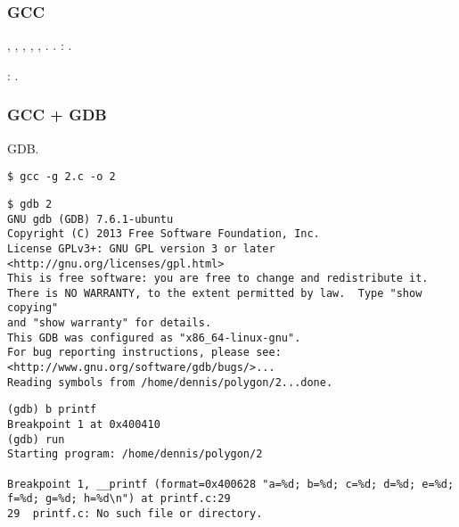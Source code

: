 \ifdefined\IncludeGCC
\subsubsection{GCC}

 \RDI, \RSI,
\RDX, \RCX, , .
.
: .

%
: .



\ifdefined\IncludeGDB
\subsubsection{GCC + GDB}

 \ac{GDB}.

\begin{lstlisting}
$ gcc -g 2.c -o 2
\end{lstlisting}

\begin{lstlisting}
$ gdb 2
GNU gdb (GDB) 7.6.1-ubuntu
Copyright (C) 2013 Free Software Foundation, Inc.
License GPLv3+: GNU GPL version 3 or later <http://gnu.org/licenses/gpl.html>
This is free software: you are free to change and redistribute it.
There is NO WARRANTY, to the extent permitted by law.  Type "show copying"
and "show warranty" for details.
This GDB was configured as "x86_64-linux-gnu".
For bug reporting instructions, please see:
<http://www.gnu.org/software/gdb/bugs/>...
Reading symbols from /home/dennis/polygon/2...done.
\end{lstlisting}

\begin{lstlisting}[caption=\RU{ставим точку останова на \printf{,} запускаем}\EN{let's set the breakpoint to \printf{,} and run}]
(gdb) b printf
Breakpoint 1 at 0x400410
(gdb) run
Starting program: /home/dennis/polygon/2 

Breakpoint 1, __printf (format=0x400628 "a=%d; b=%d; c=%d; d=%d; e=%d; f=%d; g=%d; h=%d\n") at printf.c:29
29	printf.c: No such file or directory.
\end{lstlisting}

